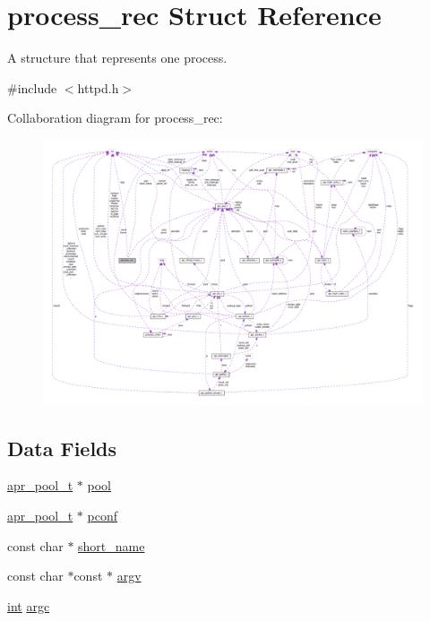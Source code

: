 \hypertarget{structprocess__rec}{}\section{process\+\_\+rec Struct Reference}
\label{structprocess__rec}


A structure that represents one process.  




{\ttfamily \#include $<$httpd.\+h$>$}



Collaboration diagram for process\+\_\+rec\+:
\nopagebreak
\begin{figure}[H]
\begin{center}
\leavevmode
\includegraphics[width=350pt]{structprocess__rec__coll__graph}
\end{center}
\end{figure}
\subsection*{Data Fields}
\begin{DoxyCompactItemize}
\item 
\hyperlink{structapr__pool__t}{apr\+\_\+pool\+\_\+t} $\ast$ \hyperlink{structprocess__rec_a10adc2d7a7a46a5285e6033cad375f24}{pool}
\item 
\hyperlink{structapr__pool__t}{apr\+\_\+pool\+\_\+t} $\ast$ \hyperlink{structprocess__rec_abd45db97ba3bd047eafc3bca08873e62}{pconf}
\item 
const char $\ast$ \hyperlink{structprocess__rec_a6e3d376827f7d434c676d08c2bf0b995}{short\+\_\+name}
\item 
const char $\ast$const $\ast$ \hyperlink{structprocess__rec_ac33b09935915f820f21f3f8a5a610519}{argv}
\item 
\hyperlink{pcre_8txt_a42dfa4ff673c82d8efe7144098fbc198}{int} \hyperlink{structprocess__rec_a0f2f21950cfa1b7ee6c7ddce4aa378f0}{argc}
\end{DoxyCompactItemize}


